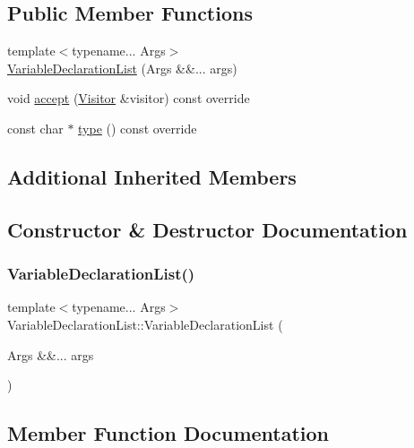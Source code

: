\subsection*{Public Member Functions}
\begin{DoxyCompactItemize}
\item 
{\footnotesize template$<$typename... Args$>$ }\\\hyperlink{struct_variable_declaration_list_a79cab6a85e69303e75972f77c1c64eee}{Variable\+Declaration\+List} (Args \&\&... args)
\item 
void \hyperlink{struct_variable_declaration_list_a78deccd334853da16479f043a4b412d8}{accept} (\hyperlink{struct_visitor}{Visitor} \&visitor) const override
\item 
const char $\ast$ \hyperlink{struct_variable_declaration_list_abef74b3fa377e47f0b4585b13fd43fbc}{type} () const override
\end{DoxyCompactItemize}
\subsection*{Additional Inherited Members}


\subsection{Constructor \& Destructor Documentation}
\mbox{\label{struct_variable_declaration_list_a79cab6a85e69303e75972f77c1c64eee}} 
\subsubsection{\texorpdfstring{Variable\+Declaration\+List()}{VariableDeclarationList()}}
{\footnotesize\ttfamily template$<$typename... Args$>$ \\
Variable\+Declaration\+List\+::\+Variable\+Declaration\+List (\begin{DoxyParamCaption}\item[{Args \&\&...}]{args }\end{DoxyParamCaption})\hspace{0.3cm}{\ttfamily [inline]}}



\subsection{Member Function Documentation}
\mbox{\label{struct_variable_declaration_list_a78deccd334853da16479f043a4b412d8}} 
